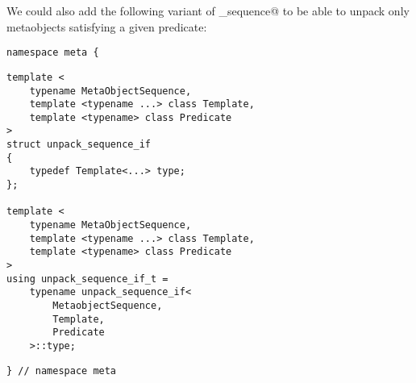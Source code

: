 We could also add the following variant of \verb@unpack_sequence@ to be
able to unpack only metaobjects satisfying a given predicate:

\begin{verbatim}
namespace meta {
\end{verbatim}
\begin{verbatim}
template <
	typename MetaObjectSequence,
	template <typename ...> class Template,
	template <typename> class Predicate
>
struct unpack_sequence_if
{
	typedef Template<...> type;
};

template <
	typename MetaObjectSequence,
	template <typename ...> class Template,
	template <typename> class Predicate
>
using unpack_sequence_if_t =
	typename unpack_sequence_if<
		MetaobjectSequence,
		Template,
		Predicate
	>::type;
\end{verbatim}
\begin{verbatim}
} // namespace meta
\end{verbatim}

